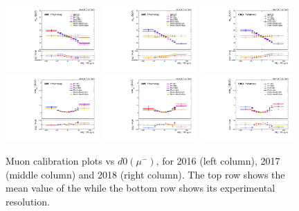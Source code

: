 \begin{figure}[!htb]
      \centering
      \captionsetup{justification=justified}
      \includegraphics[width=0.32\textwidth]{pics/muon_corr/muon_cal/2016/muN_d0_rebin_summary_mean.pdf}
      \includegraphics[width=0.32\textwidth]{pics/muon_corr/muon_cal/2017/muN_d0_rebin_summary_mean.pdf}
      \includegraphics[width=0.32\textwidth]{pics/muon_corr/muon_cal/2018/muN_d0_rebin_summary_mean.pdf}
      \includegraphics[width=0.32\textwidth]{pics/muon_corr/muon_cal/2016/muN_d0_rebin_summary_reso.pdf}
      \includegraphics[width=0.32\textwidth]{pics/muon_corr/muon_cal/2017/muN_d0_rebin_summary_reso.pdf}
      \includegraphics[width=0.32\textwidth]{pics/muon_corr/muon_cal/2018/muN_d0_rebin_summary_reso.pdf}
      \caption{Muon calibration plots vs $d0(\mu^{-})$, for 2016 (left column), 2017 (middle column) and 2018 (right column).
               The top row shows the mean value of the \mmm while the bottom row shows its experimental resolution.}
      \label{fig:mucal_muP_d0}
\end{figure}